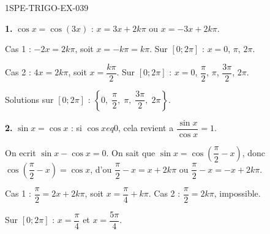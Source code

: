 \begin{corrige}{1SPE-TRIGO-EX-039}

\textbf{1.} $\cos x = \cos(3x)$ : $x = 3x + 2k\pi$ ou $x = -3x + 2k\pi$.

Cas 1 : $-2x = 2k\pi$, soit $x = -k\pi = k\pi$. Sur $[0;2\pi]$ : $x = 0$, $\pi$, $2\pi$.

Cas 2 : $4x = 2k\pi$, soit $x = \dfrac{k\pi}{2}$. Sur $[0;2\pi]$ : $x = 0$, $\dfrac{\pi}{2}$, $\pi$, $\dfrac{3\pi}{2}$, $2\pi$.

Solutions sur $[0;2\pi]$ : $\left\{0,\;\dfrac{\pi}{2},\;\pi,\;\dfrac{3\pi}{2},\;2\pi\right\}$.

\textbf{2.} $\sin x = \cos x$ : si $\cos x 
eq 0$, cela revient a $\dfrac{\sin x}{\cos x} = 1$.

On ecrit $\sin x - \cos x = 0$. On sait que $\sin x = \cos\!\left(\dfrac{\pi}{2} - x\right)$, donc $\cos\!\left(\dfrac{\pi}{2} - x\right) = \cos x$, d'ou $\dfrac{\pi}{2} - x = x + 2k\pi$ ou $\dfrac{\pi}{2} - x = -x + 2k\pi$.

Cas 1 : $\dfrac{\pi}{2} = 2x + 2k\pi$, soit $x = \dfrac{\pi}{4} + k\pi$.
Cas 2 : $\dfrac{\pi}{2} = 2k\pi$, impossible.

Sur $[0;2\pi]$ : $x = \dfrac{\pi}{4}$ et $x = \dfrac{5\pi}{4}$.

\end{corrige}
